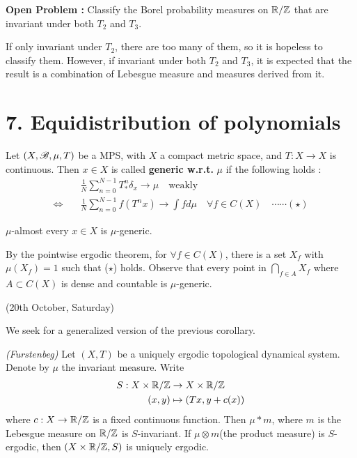 \documentclass[10pt,a4paper]{report}
\newenvironment{proof}
{\begin{changemargin}{1cm}{0.5cm} 
	}%
	{\end{changemargin}
}
\begin{document}
\textbf{Open Problem : }Classify the Borel probability measures on $\mathbb{R}/\mathbb{Z}$ that are invariant under both $T_2$ and $T_3$.

\quad If only invariant under $T_2$, there are too many of them, so it is hopeless to classify them. However, if invariant under both $T_2$ and $T_3$, it is expected that the result is a combination of Lebesgue measure and measures derived from it.
\s

\section*{7. Equidistribution of polynomials}

 Let $(X,\mathscr{B}, \mu, T)$ be a MPS, with $X$ a compact metric space, and $T:X \rightarrow X$ is continuous. Then $x\in X$ is called \textbf{generic w.r.t. } $\mu$ if the following holds :
\begin{align*}
& \frac{1}{N}\sum_{n=0}^{N-1} T^n_* \delta_x \rightarrow \mu \quad \text{weakly} \\
\Leftrightarrow \quad & \frac{1}{N} \sum_{n=0}^{N-1} f(T^n x) \rightarrow \int f d\mu \quad \forall f \in C(X) \quad \cdots\cdots (\star)
\end{align*}
\s

\lem $\mu$-almost every $x\in X$ is $\mu$-generic.
\begin{proof}
\pf By the pointwise ergodic theorem, for $\forall f \in C(X)$, there is a set $X_f$ with $\mu(X_f) =1$ such that ($\star$) holds. Observe that every point in $\bigcap_{f\in A} X_f$ where $A\subset C(X)$ is dense and countable is $\mu$-generic.

\eop
\end{proof}
\s

\newday

(20th October, Saturday)
\s

We seek for a generalized version of the previous corollary.
\s

\thm \emph{(Furstenbeg)} Let $(X,T)$ be a uniquely ergodic topological dynamical system. Denote by $\mu$ the invariant measure. Write
\begin{align*}
S: X \times \mathbb{R}/\mathbb{Z} &\rightarrow X \times \mathbb{R}/\mathbb{Z} \\
(x,y) &\mapsto (Tx, y+c(x))
\end{align*}
where $c:X\rightarrow \mathbb{R}/\mathbb{Z}$ is a fixed continuous function. Then $\mu * m$, where $m$ is the Lebesgue measure on $\mathbb{R}/\mathbb{Z}$ is $S$-invariant. If $\mu \otimes m$(the product measure) is $S$-ergodic, then $(X\times \mathbb{R}/\mathbb{Z},S)$ is uniquely ergodic.
\s
\end{document}
